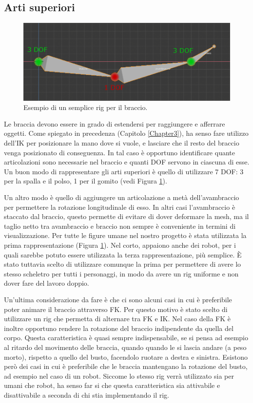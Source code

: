 \newpage
\subsection{Arti superiori}

\begin{figure}
\centering
\includegraphics[width=.8\textwidth]{Figures/arm}
\decoRule
\caption[Rig braccio]{Esempio di un semplice rig per il braccio.}
\label{fig:arm}
\end{figure}

Le braccia devono essere in grado di estendersi per raggiungere e afferrare oggetti.
Come spiegato in precedenza (Capitolo \ref{Chapter3}), ha senso fare utilizzo dell'IK per posizionare la mano dove si vuole, e lasciare che il resto del braccio venga posizionato di conseguenza.
In tal caso è opportuno identificare quante articolazioni sono necessarie nel braccio e quanti DOF servono in ciascuna di esse.
Un buon modo di rappresentare gli arti superiori è quello di utilizzare 7 DOF: 3 per la spalla e il polso, 1 per il gomito (vedi Figura \ref{fig:arm}).

Un altro modo è quello di aggiungere un articolazione a metà dell'avambraccio per permettere la rotazione longitudinale di esso.
In altri casi l'avambraccio è staccato dal braccio, questo permette di evitare di dover deformare la mesh, ma il taglio netto tra avambraccio e braccio non sempre è conveniente in termini di visualizzazione.
Per tutte le figure umane nel nostro progetto è stata utilizzata la prima rappresentazione (Figura \ref{fig:arm}).
Nel corto, appaiono anche dei robot, per i quali sarebbe potuto essere utilizzata la terza rappresentazione, più semplice.
È stato tuttavia scelto di utilizzare comunque la prima per permettere di avere lo stesso scheletro per tutti i personaggi, in modo da avere un rig uniforme e non dover fare del lavoro doppio.

Un'ultima considerazione da fare è che ci sono alcuni casi in cui è preferibile poter animare il braccio attraverso FK.
Per questo motivo è stato scelto di utilizzare un rig che permetta di alternare tra FK e IK.
Nel caso della FK è inoltre opportuno rendere la rotazione del braccio indipendente da quella del corpo.
Questa caratteristica è quasi sempre indispensabile, se si pensa ad esempio al ritardo del movimento delle braccia, quando quando le si lascia andare (a peso morto), rispetto a quello del busto, facendolo ruotare a destra e sinistra.
Esistono  però dei casi in cui è preferibile che le braccia mantengano la rotazione del busto, ad esempio nel caso di un robot.
Siccome lo stesso rig verrà utilizzato sia per umani che robot, ha senso far si che questa caratteristica sia attivabile e disattivabile a seconda di chi stia implementando il rig.

